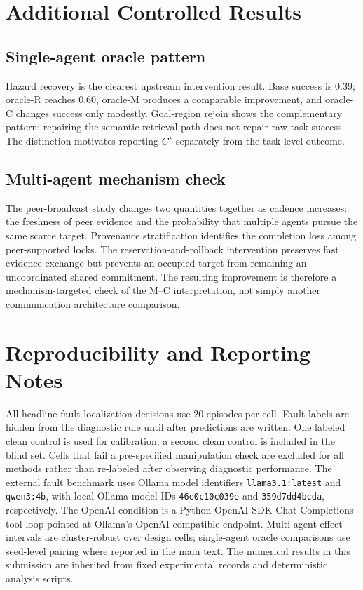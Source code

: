 \documentclass{article}
\newcommand{\Cstar}{C^{\star}}
\begin{document}
\section{Additional Controlled Results}

\subsection{Single-agent oracle pattern}
Hazard recovery is the clearest upstream intervention result. Base success is 0.39; oracle-R reaches 0.60, oracle-M produces a comparable improvement, and oracle-C changes success only modestly. Goal-region rejoin shows the complementary pattern: repairing the semantic retrieval path does not repair raw task success. The distinction motivates reporting $\Cstar$ separately from the task-level outcome.

\subsection{Multi-agent mechanism check}
The peer-broadcast study changes two quantities together as cadence increases: the freshness of peer evidence and the probability that multiple agents pursue the same scarce target. Provenance stratification identifies the completion loss among peer-supported locks. The reservation-and-rollback intervention preserves fast evidence exchange but prevents an occupied target from remaining an uncoordinated shared commitment. The resulting improvement is therefore a mechanism-targeted check of the M--C interpretation, not simply another communication architecture comparison.

\section{Reproducibility and Reporting Notes}
All headline fault-localization decisions use 20 episodes per cell. Fault labels are hidden from the diagnostic rule until after predictions are written. One labeled clean control is used for calibration; a second clean control is included in the blind set. Cells that fail a pre-specified manipulation check are excluded for all methods rather than re-labeled after observing diagnostic performance. The external fault benchmark uses Ollama model identifiers \texttt{llama3.1:latest} and \texttt{qwen3:4b}, with local Ollama model IDs \texttt{46e0c10c039e} and \texttt{359d7dd4bcda}, respectively. The OpenAI condition is a Python OpenAI SDK Chat Completions tool loop pointed at Ollama's OpenAI-compatible endpoint. Multi-agent effect intervals are cluster-robust over design cells; single-agent oracle comparisons use seed-level pairing where reported in the main text. The numerical results in this submission are inherited from fixed experimental records and deterministic analysis scripts.
\end{document}
